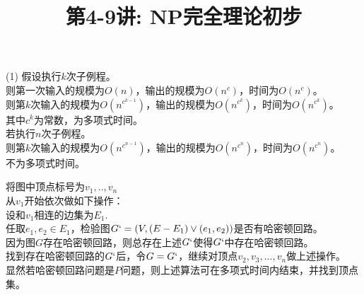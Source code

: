 \documentclass[a4paper, justified]{tufte-handout}
\title{第4-9讲: NP完全理论初步}
\date{\zhtoday} %
\begin{document}
\maketitle
\noplagiarism %
\begin{abstract}
\end{abstract}
\beginrequired

\begin{problem}[TC  34.1-5]
\end{problem}

\begin{solution}
  (1)
  假设执行$k$次子例程。\\
  则第一次输入的规模为$O(n)$，输出的规模为$O(n^c)$，时间为$O(n^c)$。\\
  则第$k$次输入的规模为$O(n^{c^{k-1}})$，输出的规模为$O(n^{c^k})$，时间为$O(n^{c^k})$。\\
  其中$c^k$为常数，为多项式时间。\\

  \noindent 若执行$n$次子例程。\\
  则第$k$次输入的规模为$O(n^{c^{n-1}})$，输出的规模为$O(n^{c^n})$，时间为$O(n^{c^n})$。\\
  不为多项式时间。
\end{solution}

\begin{problem}[TC 34.2-3]
\end{problem}

\begin{solution}
  将图中顶点标号为$v_1,..,v_n$\\
  从$v_1$开始依次做如下操作：	\\
  设和$v_1$相连的边集为$E_1$.\\
  任取$e_1,e_2\in E_1$，检验图$G`=(V,(E-E_1)\lor(e_1,e_2))$是否有哈密顿回路。\\
  因为图$G$存在哈密顿回路，则总存在上述$G`$使得$G`$中存在哈密顿回路。\\
  找到存在哈密顿回路的$G`$后，令$G=G`$，继续对顶点$v_2,v_3,...,v_n$做上述操作。\\
  显然若哈密顿回路问题是$P$问题，则上述算法可在多项式时间内结束，并找到顶点集。\\
\end{solution}
\end{document}
